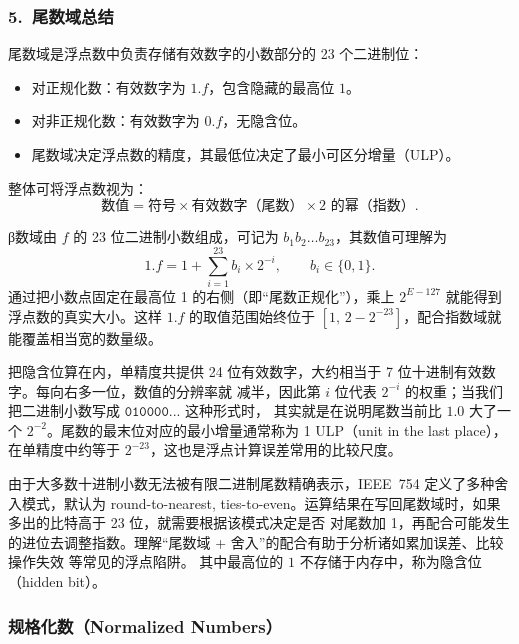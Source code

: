 \subsubsection*{5.\ 尾数域总结}
尾数域是浮点数中负责存储有效数字的小数部分的 23 个二进制位：
\begin{itemize}
    \item 对正规化数：有效数字为 $1.f$，包含隐藏的最高位 $1$。
    \item 对非正规化数：有效数字为 $0.f$，无隐含位。
    \item 尾数域决定浮点数的精度，其最低位决定了最小可区分增量（ULP）。
\end{itemize}
整体可将浮点数视为：
\[
\text{数值} = \text{符号} \times \text{有效数字（尾数）} \times \text{2 的幂（指数）}.
\]
















β数域由 $f$ 的 23 位二进制小数组成，可记为 $b_1 b_2 \ldots b_{23}$，其数值可理解为
\[
1.f = 1 + \sum_{i=1}^{23} b_i \times 2^{-i}, \qquad b_i \in \{0,1\}.
\]
通过把小数点固定在最高位 1 的右侧（即“尾数正规化”），乘上 $2^{E-127}$ 就能得到浮点数的真实大小。这样
$1.f$ 的取值范围始终位于 $\left[1,\,2-2^{-23}\right]$，配合指数域就能覆盖相当宽的数量级。

把隐含位算在内，单精度共提供 24 位有效数字，大约相当于 7 位十进制有效数字。每向右多一位，数值的分辨率就
减半，因此第 $i$ 位代表 $2^{-i}$ 的权重；当我们把二进制小数写成 $\texttt{010000...}$ 这种形式时，
其实就是在说明尾数当前比 $1.0$ 大了一个 $2^{-2}$。尾数的最末位对应的最小增量通常称为 1 ULP（unit in the
last place），在单精度中约等于 $2^{-23}$，这也是浮点计算误差常用的比较尺度。

由于大多数十进制小数无法被有限二进制尾数精确表示，IEEE~754 定义了多种舍入模式，默认为
round-to-nearest, ties-to-even。运算结果在写回尾数域时，如果多出的比特高于 23 位，就需要根据该模式决定是否
对尾数加 1，再配合可能发生的进位去调整指数。理解“尾数域 + 舍入”的配合有助于分析诸如累加误差、比较操作失效
等常见的浮点陷阱。
其中最高位的 $1$ 不存储于内存中，称为隐含位（hidden bit）。

\subsubsection{规格化数（Normalized Numbers）}

